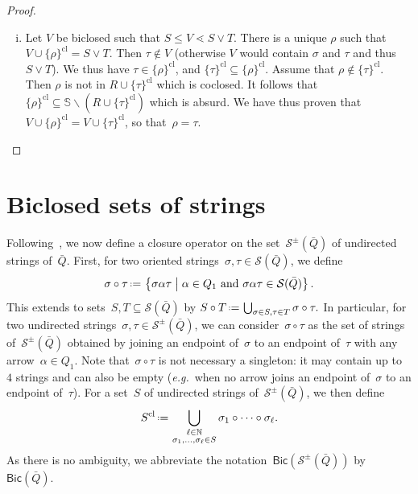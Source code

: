 \documentclass{amsart}
\theoremstyle{definition}
\newcommand{\N}{\mathbb{N}} %
\newcommand{\cS}{\mathbb{S}} %
\newcommand{\set}[2]{\left\{ #1 \;\middle|\; #2 \right\}} %
\newcommand{\ssm}{\smallsetminus} %
\newcommand{\eqdef}{\mbox{\,\raisebox{0.2ex}{\scriptsize\ensuremath{\mathrm:}}\ensuremath{=}\,}} %
\newcommand{\eg}{\textit{e.g.}~} %
\newcommand{\strings}{\mathcal{S}} %
\newcommand{\closure}[1]{#1^{\mathrm{cl}}} %
\newcommand{\Bicl}[1]{\mathsf{Bic}(#1)} %
\begin{document}
\begin{proof}
\begin{enumerate}[(i)]
\item Let $V$ be biclosed such that ${S \leq V \lessdot S \vee T}$.
There is a unique $\rho$ such that ${V \cup \closure{\{\rho\}} = S \vee T}$.
Then $\tau\notin V$ (otherwise $V$ would contain $\sigma$ and $\tau$ and thus $S\vee T$).
We thus have $\tau\in\closure{\{\rho\}}$, and $\closure{\{\tau\}}\subseteq\closure{\{\rho\}}$.
Assume that $\rho\notin\closure{\{\tau\}}$.
Then $\rho$ is not in $R\cup\closure{\{\tau\}}$ which is coclosed.
It follows that~$\closure{\{\rho\}}\subseteq \cS\ssm \left(R\cup\closure{\{\tau\}}\right)$ which is absurd.
We have thus proven that~$V \cup \closure{\{\rho\}} = V \cup \closure{\{\tau\}}$, so that~$\rho=\tau$.
\qedhere
\end{enumerate}
\end{proof}

\section{Biclosed sets of strings}
\label{sec:biclosedStrings}

Following~\cite[Sect.~6]{McConville}, we now define a closure operator on the set~$\strings^\pm(\bar Q)$ of undirected strings of~$\bar Q$.
First, for two oriented strings~$\sigma, \tau \in \strings(\bar Q)$, we define
\[
\sigma \circ \tau \eqdef \set{\sigma \alpha \tau}{\alpha \in Q_1 \text{ and } \sigma \alpha \tau \in \strings(\bar Q)}.
\]
This extends to sets~$S,T \subseteq \strings(\bar Q)$ by
\(
S \circ T \eqdef \bigcup_{\sigma \in S, \tau \in T} \sigma \circ \tau.
\)
In particular, for two undirected strings~$\sigma, \tau \in \strings^\pm(\bar Q)$, we can consider~$\sigma \circ \tau$ as the set of strings of~$\strings^\pm(\bar Q)$ obtained by joining an endpoint of~$\sigma$ to an endpoint of~$\tau$ with any arrow~$\alpha \in Q_1$.
Note that~$\sigma \circ \tau$ is not necessary a singleton: it may contain up to~$4$ strings and can also be empty (\eg when no arrow joins an endpoint of~$\sigma$ to an endpoint of~$\tau$).
For a set~$S$ of undirected strings of~$\strings^\pm(\bar Q)$, we then define
\[
\closure{S} \eqdef \bigcup_{\substack{\ell \in \N \\ \sigma_1, \dots, \sigma_\ell \in S}} \sigma_1 \circ \dots \circ \sigma_\ell.
\]
As there is no ambiguity, we abbreviate the notation~$\Bicl{\strings^\pm(\bar Q)}$ by~$\Bicl{\bar Q}$.
\end{document}

